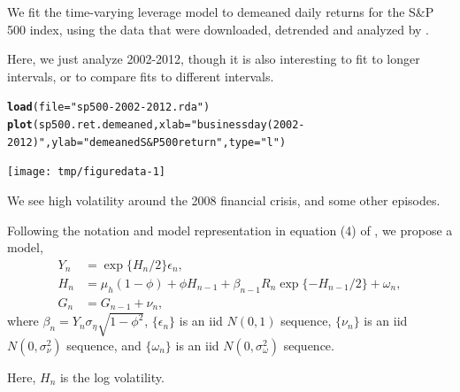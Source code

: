 \documentclass{beamer}\usepackage[]{graphicx}\usepackage[]{color}
\makeatletter
\newcommand{\hlstr}[1]{\textcolor[rgb]{0.192,0.494,0.8}{#1}}%
\newcommand{\hlstd}[1]{\textcolor[rgb]{0.345,0.345,0.345}{#1}}%
\newcommand{\hlkwc}[1]{\textcolor[rgb]{0.333,0.667,0.333}{#1}}%
\newcommand{\hlkwd}[1]{\textcolor[rgb]{0.737,0.353,0.396}{\textbf{#1}}}%
\newenvironment{kframe}{%
 \def\at@end@of@kframe{}%
 \ifinner\ifhmode%
  \def\at@end@of@kframe{\end{minipage}}%
  \begin{minipage}{\columnwidth}%
 \fi\fi%
 \def\FrameCommand##1{\hskip\@totalleftmargin \hskip-\fboxsep
 \colorbox{shadecolor}{##1}\hskip-\fboxsep
     \hskip-\linewidth \hskip-\@totalleftmargin \hskip\columnwidth}%
 \MakeFramed {\advance\hsize-\width
   \@totalleftmargin\z@ \linewidth\hsize
   \@setminipage}}%
 {\par\unskip\endMakeFramed%
 \at@end@of@kframe}
\newenvironment{knitrout}{}{} %
\makeatother
\begin{document}
\begin{frame}[fragile]

\bi

\item We fit the time-varying leverage model to demeaned daily returns for the S\&P 500 index, using the data that were downloaded, detrended and analyzed by \citet{breto14}. 

\item Here, we just analyze 2002-2012, though it is also interesting to fit to longer intervals, or to compare fits to different intervals.

\ei

\begin{knitrout}\small
{}\color{fgcolor}\begin{kframe}
\begin{alltt}
\hlkwd{load}\hlstd{(}\hlkwc{file}\hlstd{=}\hlstr{"sp500-2002-2012.rda"}\hlstd{)}
\hlkwd{plot}\hlstd{(sp500.ret.demeaned,}\hlkwc{xlab}\hlstd{=}\hlstr{"business day (2002-2012)"}\hlstd{,}\hlkwc{ylab}\hlstd{=}\hlstr{"demeaned S&P 500 return"}\hlstd{,} \hlkwc{type}\hlstd{=}\hlstr{"l"}\hlstd{)}
\end{alltt}
\end{kframe}

{\centering \texttt{[image: tmp/figuredata-1]} 

}



\end{knitrout}

\bi

\item We see high volatility around the 2008 financial crisis, and some other episodes.

\item Following the notation and model representation in equation (4) of \citet{breto14}, we propose a model,
\begin{align} 
Y_n &= \exp\{H_n/2\} \epsilon_n, \\
H_n &= \mu_h(1-\phi) + \phi H_{n-1} +
\beta_{n-1}R_n\exp\{-H_{n-1}/2\} + \omega_n,\\
G_n &= G_{n-1}+\nu_n,
\end{align}
where $\beta_n=Y_n\sigma_\eta\sqrt{1-\phi^2}$, $\{\epsilon_n\}$ is an iid $N(0,1)$ sequence, $\{\nu_n\}$ is an iid $N(0,\sigma_{\nu}^2)$ sequence, and $\{\omega_n\}$ is an iid $N(0,\sigma_\omega^2)$ sequence.

\item Here, $H_n$ is the log volatility.

\ei

\end{frame}
\end{document}
